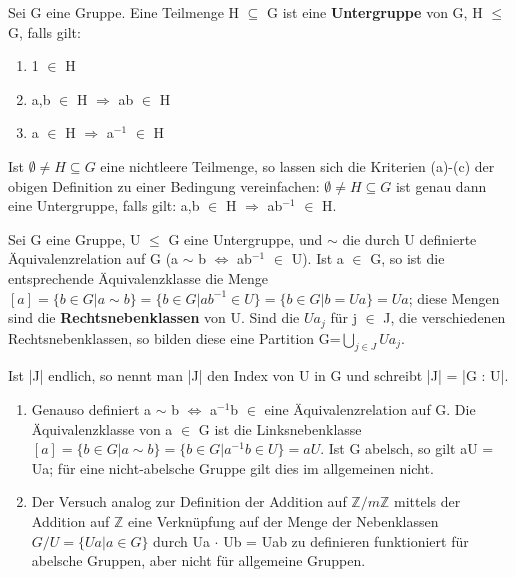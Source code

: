 \begin{definition}
Sei G eine Gruppe. Eine Teilmenge H $\subseteq$ G ist eine \textbf{Untergruppe} von G, H $\le$ G, falls gilt:
\begin{enumerate}
\item 1 $\in$ H
\item a,b $\in$ H $\Rightarrow$ ab $\in$ H
\item a $\in$ H $\Rightarrow$ a$^{-1}$ $\in$ H
\end{enumerate}
\end{definition}

\begin{remark} 
Ist $\emptyset \neq H \subseteq G$ eine nichtleere Teilmenge, so lassen sich die Kriterien (a)-(c) der obigen Definition zu einer Bedingung vereinfachen: 
$\emptyset \neq H \subseteq G$ ist genau dann eine Untergruppe, falls gilt: a,b $\in$ H $\Rightarrow$ ab$^{-1}$ $\in$ H.
\end{remark}

\begin{definition}
Sei G eine Gruppe, U $\le$ G eine Untergruppe, und $\sim$ die durch U definierte Äquivalenzrelation auf G (a $\sim$ b $\Leftrightarrow$ ab$^{-1}$ $\in$ U). Ist a $\in$ G, so ist die entsprechende Äquivalenzklasse die Menge 
$[a]=\{ b \in G | a \sim b \} = \{ b \in G | ab^{-1} \in U \} = \{ b \in G | b = Ua \} = Ua$; 
diese Mengen sind die \textbf{Rechtsnebenklassen} von U. Sind die $Ua_j$ für j $\in$ J, die verschiedenen Rechtsnebenklassen, so bilden diese eine Partition G=$\bigcup\limits_{j \in J} Ua_j$.
\end{definition}

Ist |J| endlich, so nennt man |J| den Index von U in G und schreibt |J| = |G : U|.
\begin{enumerate}
\item Genauso definiert a $\sim$ b $\Leftrightarrow$ a$^{-1}$b $\in$ eine Äquivalenzrelation auf G. Die Äquivalenzklasse von a $\in$ G ist die Linksnebenklasse $[a] = \{b \in G | a \sim b \} = \{ b \in G | a^{-1}b \in U \} = aU$. 
Ist G abelsch, so gilt aU = Ua; für eine nicht-abelsche Gruppe gilt dies im allgemeinen nicht.
\item Der Versuch analog zur Definition der Addition auf $\mathbb{Z}/m\mathbb{Z}$ mittels der Addition auf $\mathbb{Z}$ eine Verknüpfung auf der Menge der Nebenklassen $G/U = \{Ua | a \in G\}$ durch Ua $\cdot$ Ub = Uab zu definieren funktioniert für abelsche Gruppen, aber nicht für allgemeine Gruppen.
\end{enumerate}


